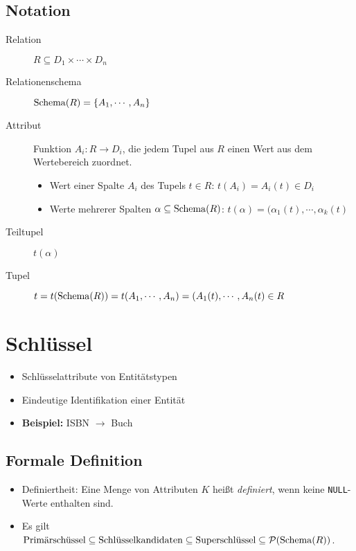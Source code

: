 	\subsection{Notation} %
		\begin{description}
			\item[Relation] \( R \subseteq D _ 1 \times \cdots \times D _ n \)
			\item[Relationenschema] \( \operatorname{Schema}(R) = \{ A _ 1, \cdots, A _ n \} \)
			\item[Attribut] Funktion \( A _ i : R \rightarrow D _ i \), die jedem Tupel aus \(R\) einen Wert aus dem Wertebereich zuordnet.
				\begin{itemize}
					\item Wert einer Spalte \(A_i\) des Tupels \( t \in R \): \( t(A_i) = A_i(t) \in D_i \)
					\item Werte mehrerer Spalten \( \alpha \subseteq \operatorname{Schema}(R) \): \( t(\alpha) = (\alpha_1(t), \cdots, \alpha_k(t) \)
				\end{itemize}
			\item[Teiltupel] \(t(\alpha)\)
			\item[Tupel] \( t = t(\operatorname{Schema}(R)) = t(A_1, \cdots, A_n) = (A_1(t), \cdots, A_n(t) \in R \)
		\end{description}

\section{Schlüssel} %
	\begin{itemize}
		\item Schlüsselattribute von Entitätstypen
		\item Eindeutige Identifikation einer Entität
		\item \textbf{Beispiel:} ISBN \(\rightarrow\) Buch
	\end{itemize}

	\subsection{Formale Definition} %
		\begin{itemize}
			\item Definiertheit: Eine Menge von Attributen \(K\) heißt \textit{definiert}, wenn keine \lstinline|NULL|-Werte enthalten sind.
			\item Es gilt \( \text{Primärschüssel} \subseteq \text{Schlüsselkandidaten} \subseteq \text{Superschlüssel} \subseteq \mathcal{P}(\operatorname{Schema}(R)) \).
		\end{itemize}

